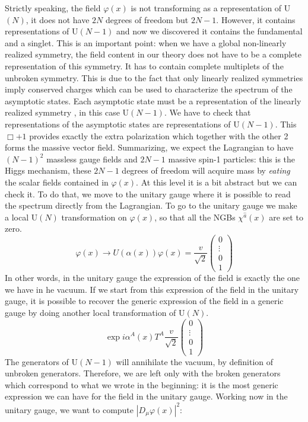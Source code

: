 \documentclass[../main.tex]{subfiles}
\begin{document}
Strictly speaking, the field $\varphi(x)$ is not transforming as a representation of U$(N)$, it does not have $2N$ degrees of freedom but $2N-1$. However, it contains representations of U$(N-1)$ and now we discovered it contains the fundamental and a singlet. This is an important point: when we have a global non-linearly realized symmetry, the field content in our theory does not have to be a complete representation of this symmetry. It has to contain complete multiplets of the unbroken symmetry. This is due to the fact that only linearly realized symmetries imply conserved charges which can be used to characterize the spectrum of the asymptotic states. Each asymptotic state must be a representation of the linearly realized symmetry , in this case U$(N-1)$. We have to check that representations of the asymptotic states are representations of U$(N-1)$. This $\Box+1$ provides exactly the extra polarization which together with the other 2 forms the massive vector field. Summarizing, we expect the Lagrangian to have $(N-1)^2$ massless gauge fields and $2N-1$ massive spin-1 particles: this is the Higgs mechanism, these $2N-1$ degrees of freedom will acquire mass by \textit{eating} the scalar fields  contained in $\varphi(x)$. At this level it is a bit abstract but we can check it. To do that, we move to the unitary gauge where it is possible to read the spectrum directly from the Lagrangian. To go to the unitary gauge we make a local U$(N)$ transformation on $\varphi(x)$, so that all the NGBs $\chi^{\hat{a}}(x)$ are set to zero.
\[
\varphi(x)\to U(\alpha(x))\varphi(x)=\frac{v}{\sqrt{2}}\begin{pmatrix}
    0\\
    \vdots\\
    0\\
    1
\end{pmatrix}
\]
In other words, in the unitary gauge the expression of the field is exactly the one we have in he vacuum. If we start from this expression of the field in the unitary gauge, it is possible to recover the generic expression of the field in a generic gauge by doing another local transformation of U$(N)$. 
\[
\exp{i\alpha^A(x)T^A}\frac{v}{\sqrt{2}}\begin{pmatrix}
    0\\
    \vdots\\
    0\\
    1
\end{pmatrix}
\]
The generators of U$(N-1)$ will annihilate the vacuum, by definition of unbroken generators. Therefore, we are left only with the broken generators which correspond to what we wrote in the beginning: it is the most generic expression we can have for the field in the unitary gauge. Working now in the unitary gauge, we want to compute $|D_\mu\varphi(x)|^2$:
\end{document}
